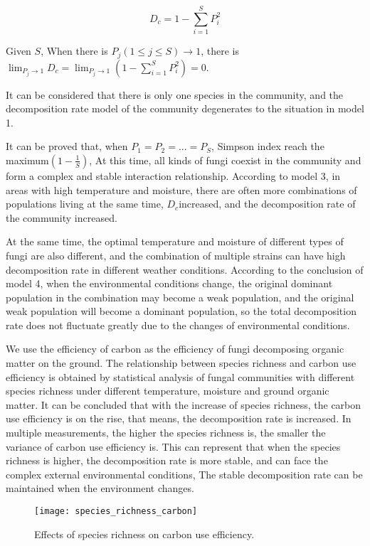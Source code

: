 \documentclass{mcmthesis}
\begin{document}
\begin{equation}
  D_c=1-\sum_{i=1}^{S}P_i^{2}
\end{equation}

Given $ S $, When there is $ P_j(1\leq{j} \leq{S})\rightarrow{1} $, there is $\lim_{P_j \rightarrow 1}{D_c}=\lim_{P_j \rightarrow 1}{\left(1-\sum_{i=1}^{S}P_i^{2}\right)}=0$.

It can be considered that there is only one species in the community, and the decomposition rate model of the community degenerates to the situation in model 1.

It can be proved that, when $ P_1=P_2=...=P_S $, Simpson index reach the maximum$ \left(1-\frac{1}{S}\right) $, At this time, all kinds of fungi coexist in the community and form a complex and stable interaction relationship. According to model 3, in areas with high temperature and moisture, there are often more combinations of populations living at the same time, $ D_c $increased, and the decomposition rate of the community increased.

At the same time, the optimal temperature and moisture of different types of fungi are also different, and the combination of multiple strains can have high decomposition rate in different weather conditions. According to the conclusion of model 4, when the environmental conditions change, the original dominant population in the combination may become a weak population, and the original weak population will become a dominant population, so the total decomposition rate does not fluctuate greatly due to the changes of environmental conditions.

We use the efficiency of carbon as the efficiency of fungi decomposing organic matter on the ground. The relationship between species richness and carbon use efficiency is obtained by statistical analysis of fungal communities with different species richness under different temperature, moisture and ground organic matter. It can be concluded that with the increase of species richness, the carbon use efficiency is on the rise, that means, the decomposition rate is increased. In multiple measurements, the higher the species richness is, the smaller the variance of carbon use efficiency is. This can represent that when the species richness is higher, the decomposition rate is more stable, and can face the complex external environmental conditions, The stable decomposition rate can be maintained when the environment changes.


\begin{figure}[H]
  \small
  \centering
  \texttt{[image: species\_richness\_carbon]}
  \caption{Effects of species richness on carbon use efficiency.}
  \label{species_richness_carbon}
\end{figure}
\end{document}
